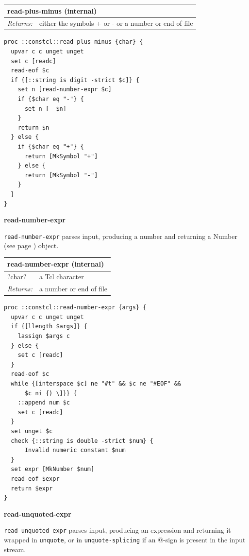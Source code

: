 \documentclass[twoside,9pt]{report}
\begin{document}
\begin{tabular}{ |l l| }
\hline
\multicolumn{2}{|l|}{read-plus-minus (internal)} \\
\hline
\textit{Returns:} & either the symbols + or - or a number or end of file \\
\hline
\end{tabular}

\noindent\makebox[\linewidth]{\rule{\linewidth}{0.4pt}}
\begin{lstlisting}
proc ::constcl::read-plus-minus {char} {
  upvar c c unget unget
  set c [readc]
  read-eof $c
  if {[::string is digit -strict $c]} {
    set n [read-number-expr $c]
    if {$char eq "-"} {
      set n [- $n]
    }
    return $n
  } else {
    if {$char eq "+"} {
      return [MkSymbol "+"]
    } else {
      return [MkSymbol "-"]
    }
  }
}
\end{lstlisting}
\noindent\makebox[\linewidth]{\rule{\linewidth}{0.4pt}}

\textbf{read-number-expr}


\texttt{read-number-expr} parses input, producing a number and returning a Number (see page \pageref{numbers}) object.

\begin{tabular}{ |l l| }
\hline
\multicolumn{2}{|l|}{read-number-expr (internal)} \\
\hline
?char? & a Tcl character \\
\textit{Returns:} & a number or end of file \\
\hline
\end{tabular}

\noindent\makebox[\linewidth]{\rule{\linewidth}{0.4pt}}
\begin{lstlisting}
proc ::constcl::read-number-expr {args} {
  upvar c c unget unget
  if {[llength $args]} {
    lassign $args c
  } else {
    set c [readc]
  }
  read-eof $c
  while {[interspace $c] ne "#t" && $c ne "#EOF" &&
      $c ni {) \]}} {
    ::append num $c
    set c [readc]
  }
  set unget $c
  check {::string is double -strict $num} {
      Invalid numeric constant $num
  }
  set expr [MkNumber $num]
  read-eof $expr
  return $expr
}
\end{lstlisting}
\noindent\makebox[\linewidth]{\rule{\linewidth}{0.4pt}}

\textbf{read-unquoted-expr}


\texttt{read-unquoted-expr} parses input, producing an expression and returning it wrapped in \texttt{unquote}, or in \texttt{unquote-splicing} if an @-sign is present in the input stream.
\end{document}
